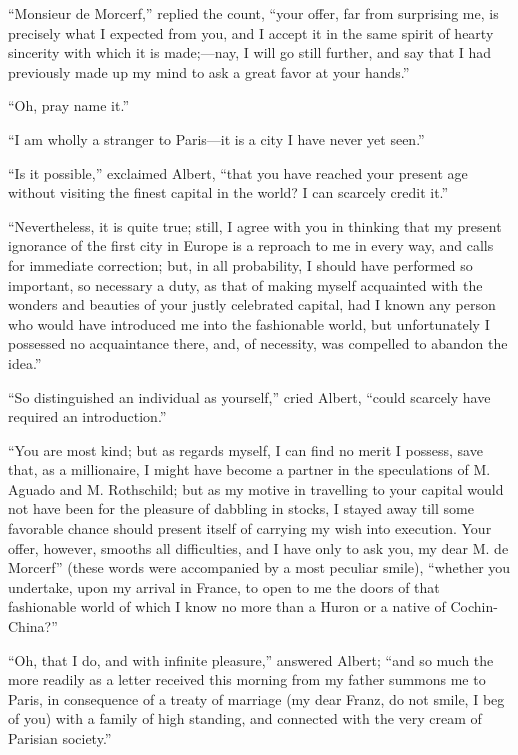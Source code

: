 “Monsieur de Morcerf,” replied the count, “your offer, far from
surprising me, is precisely what I expected from you, and I accept it
in the same spirit of hearty sincerity with which it is made;—nay, I
will go still further, and say that I had previously made up my mind to
ask a great favor at your hands.”

“Oh, pray name it.”

“I am wholly a stranger to Paris—it is a city I have never yet seen.”

“Is it possible,” exclaimed Albert, “that you have reached your present
age without visiting the finest capital in the world? I can scarcely
credit it.”

“Nevertheless, it is quite true; still, I agree with you in thinking
that my present ignorance of the first city in Europe is a reproach to
me in every way, and calls for immediate correction; but, in all
probability, I should have performed so important, so necessary a duty,
as that of making myself acquainted with the wonders and beauties of
your justly celebrated capital, had I known any person who would have
introduced me into the fashionable world, but unfortunately I possessed
no acquaintance there, and, of necessity, was compelled to abandon the
idea.”

“So distinguished an individual as yourself,” cried Albert, “could
scarcely have required an introduction.”

“You are most kind; but as regards myself, I can find no merit I
possess, save that, as a millionaire, I might have become a partner in
the speculations of M. Aguado and M. Rothschild; but as my motive in
travelling to your capital would not have been for the pleasure of
dabbling in stocks, I stayed away till some favorable chance should
present itself of carrying my wish into execution. Your offer, however,
smooths all difficulties, and I have only to ask you, my dear M. de
Morcerf” (these words were accompanied by a most peculiar smile),
“whether you undertake, upon my arrival in France, to open to me the
doors of that fashionable world of which I know no more than a Huron or
a native of Cochin-China?”

“Oh, that I do, and with infinite pleasure,” answered Albert; “and so
much the more readily as a letter received this morning from my father
summons me to Paris, in consequence of a treaty of marriage (my dear
Franz, do not smile, I beg of you) with a family of high standing, and
connected with the very cream of Parisian society.”

